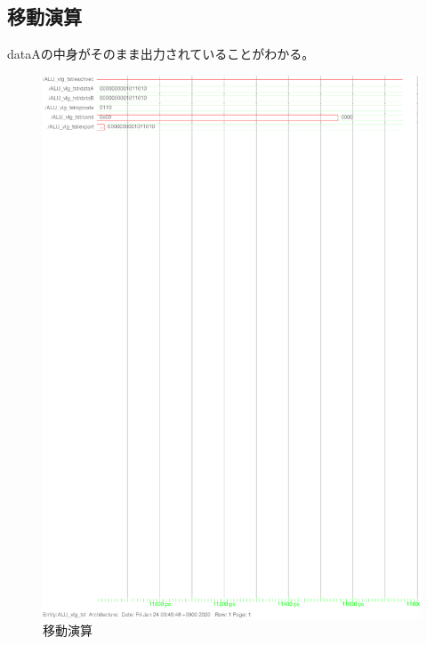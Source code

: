\documentclass{jsarticle}
\begin{document}
\subsection{移動演算}
dataAの中身がそのまま出力されていることがわかる。
\begin{figure}
    \caption{移動演算}
  \includegraphics[scale=0.8]{ALU_mv.ps}
\end{figure}
\end{document}
